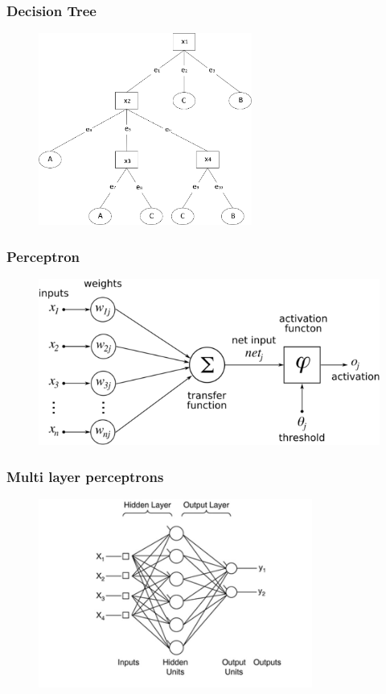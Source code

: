 \documentclass{beamer}
\begin{document}

\begin{frame} %
\frametitle{Decision Tree}
\begin{figure}
	\centering
    \includegraphics[width=70mm,scale=1]{./img/decisiontree.png}
\end{figure}

\end{frame}

\begin{frame} %
\frametitle{Perceptron}
\begin{figure}
	\centering
    \includegraphics[width=\textwidth]{./img/perceptron.png}
\end{figure}

\end{frame}
\begin{frame}
\frametitle{Multi layer perceptrons}
\begin{figure}
	\centering
    \includegraphics[width=90mm,scale=1]{./img/MLP.jpg}
\end{figure}
\end{frame}
\end{document}
